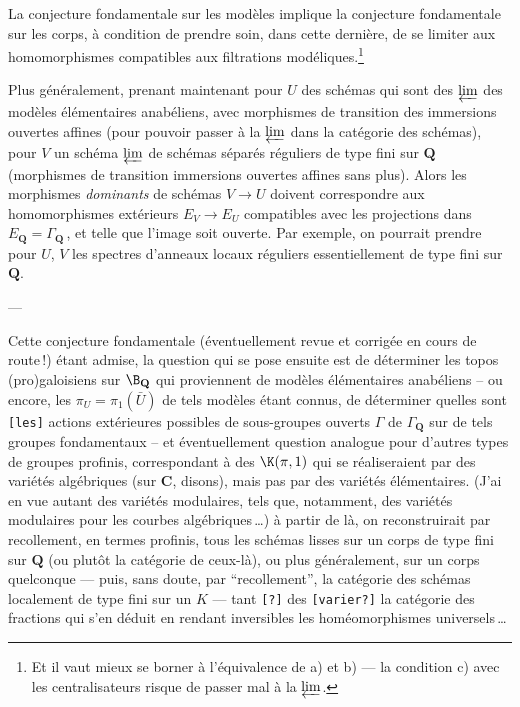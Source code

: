 La conjecture fondamentale sur les modèles implique la conjecture
fondamentale sur les corps, à condition de prendre soin, dans cette
dernière, de se limiter aux homomorphismes compatibles aux
filtrations modéliques.\footnote{Et il vaut mieux se borner à
l'équivalence de a) et b) --- la condition c) avec les
centralisateurs risque de passer mal à la $\varprojlim$.}

Plus généralement, prenant maintenant pour $U$ des schémas qui sont
des $\varprojlim$ des modèles élémentaires anabéliens, avec
morphismes de transition des immersions ouvertes affines (pour
pouvoir passer à la $\varprojlim$ dans la catégorie des schémas),
pour $V$ un schéma $\varprojlim$ de schémas séparés réguliers de type
fini sur $\mathbf{Q}$ (morphismes de transition immersions ouvertes affines
sans plus). Alors les morphismes \emph{dominants} de schémas $V \to
U$ doivent correspondre aux homomorphismes extérieurs  $E_V \to E_U$
compatibles avec les projections dans $E_\mathbf{Q} = \Gamma_\mathbf{Q}\,$, et telle
que l'image soit ouverte. Par exemple, on pourrait prendre pour $U$,
$V$ les spectres d'anneaux locaux réguliers essentiellement%
de type fini sur $\mathbf{Q}$.

\begin{center}
---
\end{center}

Cette conjecture fondamentale (éventuellement revue et corrigée en
cours de route\,!) étant admise, la question qui se pose ensuite est
de déterminer les topos (pro)galoisiens sur $\B_{\mathbf{Q}}$ qui proviennent
de modèles élémentaires anabéliens -- ou encore, les $\pi_U =
\pi_1(\bar{U})$ de tels modèles étant connus, de déterminer quelles
sont
{\tt [les]} actions extérieures possibles de sous-groupes ouverts
$\Gamma$ de $\Gamma_{\mathbf{Q}}$ sur de tels groupes fondamentaux -- et
éventuellement question analogue pour d'autres types de groupes
profinis, correspondant à des $\K(\pi, 1)$ qui se réaliseraient par
des variétés algébriques (sur $\mathbf{C}$, disons), mais pas par des
variétés élémentaires. (J'ai en vue autant des variétés modulaires,
tels que, notamment, des variétés modulaires pour les courbes
algébriques\,\dots) à partir de là, on reconstruirait par
recollement, en termes profinis, tous les schémas lisses sur un corps
de type fini sur $\mathbf{Q}$ (ou plutôt la catégorie de ceux-là), ou plus
généralement, sur un corps quelconque --- puis, sans doute, par
``recollement'', la catégorie des schémas localement de type fini sur
un $K$ --- tant {\tt [?]} des {\tt [varier?]} la catégorie des
fractions qui s'en déduit en rendant inversibles les homéomorphismes
universels\,\dots

